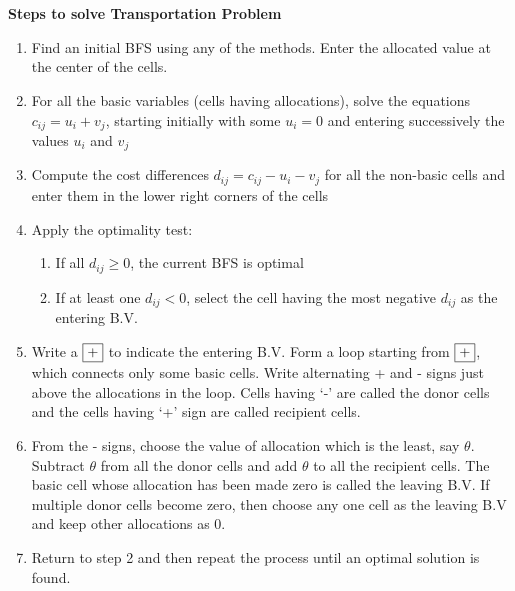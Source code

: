 \documentclass[11pt]{article}
\begin{document}
\section*{}
\label{sec-1}
{\Large  \bf Steps to solve Transportation Problem}\\

\begin{enumerate}
\item Find an initial BFS using any of the methods. Enter the allocated value at the center of the cells.
\item For all the basic variables (cells having allocations), solve the equations $c_{ij}=u_i+v_j$, starting initially with some $u_i=0$ and entering successively the values $u_i$ and $v_j$
\item Compute the cost differences $d_{ij}=c_{ij}-u_i-v_j$ for all the non-basic cells and enter them in the lower right corners of the cells 
\item Apply the optimality test:
\begin{enumerate}
\item If all $d_{ij}\ge 0$, the current BFS is optimal
\item If at least one $d_{ij}<0$, select the cell having the most negative $d_{ij}$ as the entering B.V.
\end{enumerate}
\item Write a $\fbox{+}$ to indicate the entering B.V. Form a loop starting from $\fbox{+}$, which connects only some basic cells. Write alternating + and - signs just above the allocations in the loop. Cells having `-' are called the donor cells and the cells having `+' sign are called recipient cells.
\item From the - signs, choose the value of allocation which is the least, say $\theta$. Subtract $\theta$ from all the donor cells and add $\theta$ to all the recipient cells. The basic cell whose allocation has been made zero is called the leaving B.V. 
     If multiple donor cells become zero, then choose any one cell as the leaving B.V and keep other allocations as 0.
\item Return to step 2 and then repeat the process until an optimal solution is found.
\end{enumerate}
\end{document}
